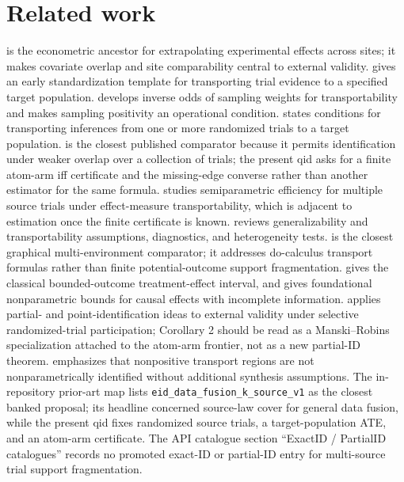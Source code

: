 \documentclass[11pt]{article}
\theoremstyle{definition}
\theoremstyle{plain}
\theoremstyle{remark}
\begin{document}
\section{Related work}
\citet{HotzImbensMortimer2005} is the econometric ancestor for extrapolating experimental effects across sites; it makes covariate overlap and site comparability central to external validity. \citet{ColeStuart2010} gives an early standardization template for transporting trial evidence to a specified target population. \citet{WestreichEdwardsLeskoStuartCole2017} develops inverse odds of sampling weights for transportability and makes sampling positivity an operational condition. \citet{DahabrehPetitoRobertsonHernanSteingrimsson2020} states conditions for transporting inferences from one or more randomized trials to a target population. \citet[Sec. 3.4, Theorem 3]{DahabrehRobertsonPetitoHernanSteingrimsson2023} is the closest published comparator because it permits identification under weaker overlap over a collection of trials; the present qid asks for a finite atom-arm iff certificate and the missing-edge converse rather than another estimator for the same formula. \citet{SuRytgaardRavnEriksson2024} studies semiparametric efficiency for multiple source trials under effect-measure transportability, which is adjacent to estimation once the finite certificate is known. \citet{DegtiarRose2023} reviews generalizability and transportability assumptions, diagnostics, and heterogeneity tests. \citet{BareinboimLeeHonavarPearl2013} is the closest graphical multi-environment comparator; it addresses do-calculus transport formulas rather than finite potential-outcome support fragmentation. \citet{Manski1990} gives the classical bounded-outcome treatment-effect interval, and \citet{Robins1989} gives foundational nonparametric bounds for causal effects with incomplete information. \citet{KlineTamer2018} applies partial- and point-identification ideas to external validity under selective randomized-trial participation; Corollary 2 should be read as a Manski--Robins specialization attached to the atom-arm frontier, not as a new partial-ID theorem. \citet{ZivichEdwardsShookSaLofgrenLesslerCole2025} emphasizes that nonpositive transport regions are not nonparametrically identified without additional synthesis assumptions. The in-repository prior-art map lists \texttt{eid\_data\_fusion\_k\_source\_v1} as the closest banked proposal; its headline concerned source-law cover for general data fusion, while the present qid fixes randomized source trials, a target-population ATE, and an atom-arm certificate. The API catalogue section ``ExactID / PartialID catalogues'' records no promoted exact-ID or partial-ID entry for multi-source trial support fragmentation.
\end{document}
